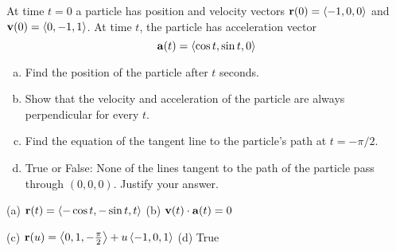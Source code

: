 \begin{question} [M200 2003A] %
 At time $t=0$ a particle has position and velocity vectors
$\mathbf{r}(0)=\left< -1,0,0\right>$ and $\mathbf{v}(0)=\left< 0,-1,1\right>$. At time $t$, 
the particle has acceleration vector 
\begin{equation*}
\mathbf{a}(t)=\left< \cos t,\sin t,0\right>
\end{equation*}
\begin{enumerate}[(a)]
\item 
Find the position of the particle after $t$ seconds.
\item 
Show that the velocity and acceleration of the particle are
always perpendicular for every $t$. 
\item
 Find the equation of the tangent line to the particle's path
at $t=-\pi/2$. 
\item
True or False: None of the lines tangent to the path of the
particle pass through $(0,0,0)$. Justify your answer.
\end{enumerate} 
\end{question}


\begin{answer}
(a) $\mathbf{r}(t)=\left< -\cos t, -\sin t, t\right>$\qquad
(b) $\mathbf{v}(t)\cdot\mathbf{a}(t)=0$

(c) $\mathbf{r}(u)=\left< 0,1,-\frac{\pi}{2}\right>+u\left< -1,0,1\right>$\qquad
(d) True
\end{answer}

